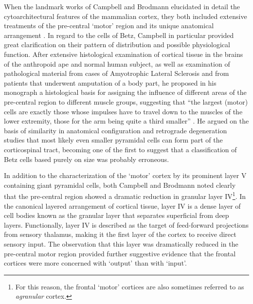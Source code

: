 When the landmark works of Campbell and Brodmann elucidated in detail the cytoarchitectural features of the mammalian cortex, they both included extensive treatments of the pre-central ‘motor’ region and its unique anatomical arrangement \cite{Campbell1905,Brodmann1909}. In regard to the cells of Betz, Campbell in particular provided great clarification on their pattern of distribution and possible physiological function. After extensive histological examination of cortical tissue in the brains of the anthropoid ape and normal human subject, as well as examination of pathological material from cases of Amyotrophic Lateral Sclerosis and from patients that underwent amputation of a body part, he proposed in his monograph a histological basis for assigning the influence of different areas of the pre-central region to different muscle groups, suggesting that ``the largest (motor) cells are exactly those whose impulses have to travel down to the muscles of the lower extremity, those for the arm being quite a third smaller'' \cite[p.33]{Campbell1905}. He argued on the basis of similarity in anatomical configuration and retrograde degeneration studies that most likely even smaller pyramidal cells can form part of the corticospinal tract, becoming one of the first to suggest that a classification of Betz cells based purely on size was probably erroneous.

In addition to the characterization of the ‘motor’ cortex by its prominent layer V containing giant pyramidal cells, both Campbell and Brodmann noted clearly that the pre-central region showed a dramatic reduction in granular layer IV\footnote{For this reason, the frontal ‘motor’ cortices are also sometimes referred to as \emph{agranular} cortex.}. In the canonical layered arrangement of cortical tissue, layer IV is a dense layer of cell bodies known as the granular layer that separates superficial from deep layers. Functionally, layer IV is described as the target of feed-forward projections from sensory thalamus, making it the first layer of the cortex to receive direct sensory input. The observation that this layer was dramatically reduced in the pre-central motor region provided further suggestive evidence that the frontal cortices were more concerned with ‘output’ than with ‘input’.

